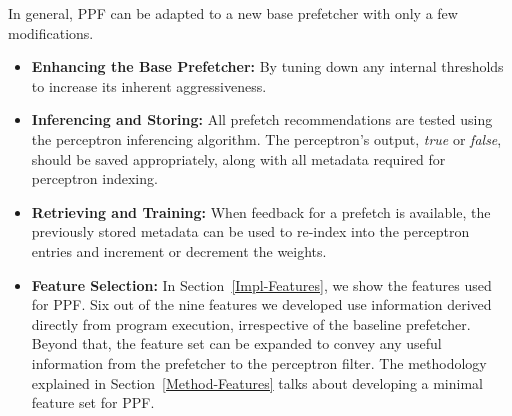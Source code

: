 In general, PPF can be adapted to a new base prefetcher with only a
few modifications.
\begin{itemize}

\item \textbf{Enhancing the Base Prefetcher:} By tuning down any
  internal thresholds to increase its inherent aggressiveness.

\item \textbf{Inferencing and Storing:} All prefetch recommendations
  are tested using the perceptron inferencing algorithm. The
  perceptron's output, \textit{true} or \textit{false}, should be
  saved appropriately, along with all metadata required for perceptron
  indexing.

\item \textbf{Retrieving and Training:} When feedback for a prefetch
  is available, the previously stored metadata can be used to re-index
  into the perceptron entries and increment or decrement the weights.

\item \textbf{Feature Selection:} In Section~\ref{Impl-Features}, we
  show the features used for PPF. Six out of the nine features we
  developed use information derived directly from program execution,
  irrespective of the baseline prefetcher. Beyond that, the feature
  set can be expanded to convey any useful information from the
  prefetcher to the perceptron filter.  The methodology explained in
  Section~\ref{Method-Features} talks about developing a minimal
  feature set for PPF. 

\end{itemize}

